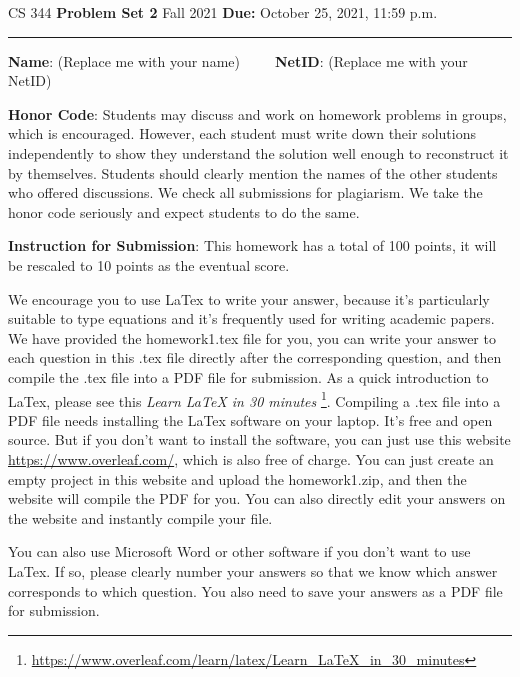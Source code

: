\documentclass[12pt]{article}
\begin{document}
\noindent
CS 344 \hfill \textbf{Problem Set 2} \newline 
{Fall 2021} \hfill \textbf{Due:} October 25, 2021, 11:59 p.m.

\noindent
\rule{\linewidth}{0.4pt}

\vspace{.5cm}

\textbf{Name}: ({\color{blue}Replace me with your name})~~~~~\textbf{NetID}: ({\color{blue}Replace me with your NetID})

\vspace{.5cm}

\textbf{Honor Code}: Students may discuss and work on homework problems in groups, which is encouraged. However, each student must write down their solutions independently to show they understand the solution well enough to reconstruct it by themselves.  Students should clearly mention the names of the other students who offered discussions. We check all submissions for plagiarism. We take the honor code seriously and expect students to do the same.


\vspace{.5cm}

\textbf{Instruction for Submission}: This homework has a total of 100 points, it will be rescaled to 10 points as the eventual score. 

We encourage you to use LaTex to write your answer, because it's particularly suitable to type equations and it's frequently used for writing academic papers. We have provided the homework1.tex file for you, you can write your answer to each question in this .tex file directly after the corresponding question, and then compile the .tex file into a PDF file for submission. As a quick introduction to LaTex, please see this \textit{Learn LaTeX in 30 minutes} \footnote{\url{https://www.overleaf.com/learn/latex/Learn_LaTeX_in_30_minutes}}. Compiling a .tex file into a PDF file needs installing the LaTex software on your laptop. It's free and open source. But if you don't want to install the software, you can just use this website \url{https://www.overleaf.com/}, which is also free of charge. You can just create an empty project in this website and upload the homework1.zip, and then the website will compile the PDF for you. You can also directly edit your answers on the website and instantly compile your file.

You can also use Microsoft Word or other software if you don't want to use LaTex. If so, please clearly number your answers so that we know which answer corresponds to which question. You also need to save your answers as a PDF file for submission.
\end{document}

